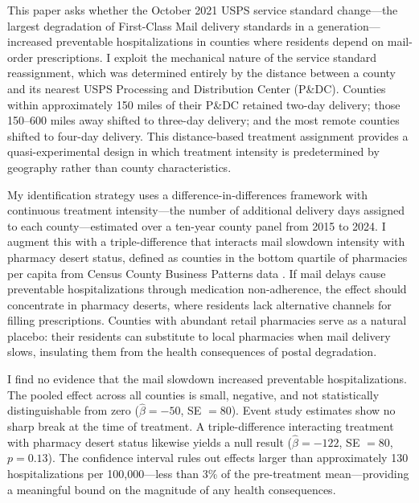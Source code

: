 \documentclass[12pt]{article}
\begin{document}
This paper asks whether the October 2021 USPS service standard change---the largest degradation of First-Class Mail delivery standards in a generation---increased preventable hospitalizations in counties where residents depend on mail-order prescriptions. I exploit the mechanical nature of the service standard reassignment, which was determined entirely by the distance between a county and its nearest USPS Processing and Distribution Center (P\&DC). Counties within approximately 150 miles of their P\&DC retained two-day delivery; those 150--600 miles away shifted to three-day delivery; and the most remote counties shifted to four-day delivery. This distance-based treatment assignment provides a quasi-experimental design in which treatment intensity is predetermined by geography rather than county characteristics.

My identification strategy uses a difference-in-differences framework with continuous treatment intensity---the number of additional delivery days assigned to each county---estimated over a ten-year county panel from 2015 to 2024. I augment this with a triple-difference that interacts mail slowdown intensity with pharmacy desert status, defined as counties in the bottom quartile of pharmacies per capita from Census County Business Patterns data \citep{census_cbp}. If mail delays cause preventable hospitalizations through medication non-adherence, the effect should concentrate in pharmacy deserts, where residents lack alternative channels for filling prescriptions. Counties with abundant retail pharmacies serve as a natural placebo: their residents can substitute to local pharmacies when mail delivery slows, insulating them from the health consequences of postal degradation.

I find no evidence that the mail slowdown increased preventable hospitalizations. The pooled effect across all counties is small, negative, and not statistically distinguishable from zero ($\hat{\beta} = -50$, SE $= 80$). Event study estimates show no sharp break at the time of treatment. A triple-difference interacting treatment with pharmacy desert status likewise yields a null result ($\hat{\beta} = -122$, SE $= 80$, $p = 0.13$). The confidence interval rules out effects larger than approximately 130 hospitalizations per 100,000---less than 3\% of the pre-treatment mean---providing a meaningful bound on the magnitude of any health consequences.
\end{document}
